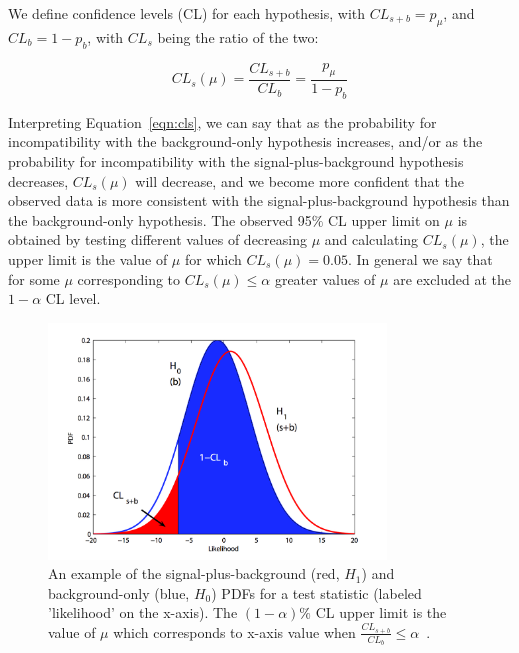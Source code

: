 \noindent We define confidence levels (CL) for each hypothesis, with $CL_{s+b} = p_{\mu}$, and $CL_{b} = 1-p_{b}$, with $CL_{s}$ being the ratio of the two:

\begin{equation}
\label{eqn:cls}
CL_{s}(\mu) = \frac{CL_{s+b}}{CL_{b}} = \frac{p_{\mu}}{1-p_{b}}
\end{equation}

\noindent Interpreting Equation~\ref{eqn:cls}, we can say that as the probability for incompatibility with the background-only hypothesis increases, and/or as the probability
for incompatibility with the signal-plus-background hypothesis decreases, $CL_{s}(\mu)$ will decrease, and we become more confident that the observed data is more consistent with
the signal-plus-background hypothesis than the background-only hypothesis. The observed 95$\%$ CL upper limit on $\mu$ is obtained by testing different values of decreasing $\mu$ and
calculating $CL_{s}(\mu)$, the upper limit is the value of $\mu$ for which $CL_{s}(\mu) = 0.05$. In general we say that for some $\mu$ corresponding to $CL_{s}(\mu) \leq \alpha$
greater values of $\mu$ are excluded at the $1-\alpha$ CL level. 

\begin{figure}[htb]
        \centering 
        \includegraphics[width=0.80\textwidth]{ch11_figs/cls.pdf}
        \caption[Test statistic PDFs for s+b and b-only hypotheses]{An example of the signal-plus-background (red, $H_{1}$) and background-only (blue, $H_{0}$) PDFs for a
          test statistic (labeled 'likelihood' on the x-axis). The $(1-\alpha)\%$ CL upper limit is the value of $\mu$ which corresponds to x-axis value
          when $\frac{CL_{s+b}}{CL_{b}} \leq \alpha$~\cite{lhc4peds}.}
        \label{fig:cls}
\end{figure}

